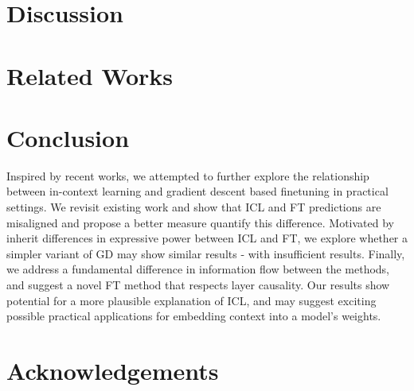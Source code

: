 \documentclass[11pt]{article}
\begin{document}
\section{Discussion}


\section{Related Works} \label{sec:related}


\section{Conclusion}
Inspired by recent works, we attempted to further explore the relationship between in-context learning and gradient descent based finetuning in practical settings.
We revisit existing work and show that ICL and FT predictions are misaligned and propose a better measure quantify this difference.
Motivated by inherit differences in expressive power between ICL and FT, we explore whether a simpler variant of GD may show similar results - with insufficient results.
Finally, we address a fundamental difference in information flow between the methods, and suggest a novel FT method that respects layer causality.
Our results show potential for a more plausible explanation of ICL, and may suggest exciting possible practical applications for embedding context into a model's weights.  
\section{Acknowledgements}





\newpage
\appendix
% 
\end{document}

